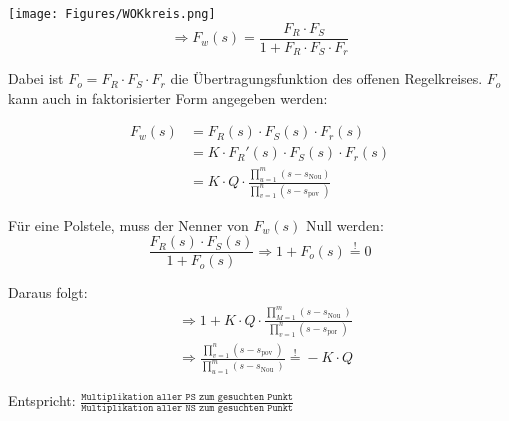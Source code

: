 \texttt{[image: Figures/WOKkreis.png]}
\[
	\Rightarrow F_w (s)= \dfrac {F_R \cdot F_S} {1+F_R \cdot F_S \cdot F_r}
\]

\begin{mdframed}[style=exercise]
	Dabei ist $F_o = F_R \cdot F_S \cdot F_r$ die Übertragungsfunktion des
	offenen Regelkreises. $F_o$ kann auch in faktorisierter Form angegeben
	werden:
\end{mdframed}

\begin{align*}
	F_w (s) & = F_R (s) \cdot F_S (s) \cdot F_r (s)
	\\ & =K \cdot F_R '(s) \cdot F_S (s) \cdot F_r (s)
	\\ & =K \cdot Q \cdot \frac{\prod_{u=1}^{m}\left(s-s_{\text {Nou}}\right)}{\prod_{v=1}^{n}\left(s-s_{\text {pov }}\right)}
\end{align*}

Für eine Polstele, muss der Nenner von $F_w (s)$ Null werden:
\[
	\dfrac{F_R (s) \cdot F_S (s)}{1+F_o (s)} \Rightarrow 1+F_o (s) \stackrel{!}{=}0
\]

Daraus folgt:
\begin{align*}
	 & \Rightarrow 1+ K \cdot Q \cdot \frac{\prod_{M=1}^{m}\left(s-s_{\text {Nou }}\right)}{\prod_{v=1}^{n}\left(s-s_{\text {por }}\right)}         \\
	 & \Rightarrow \frac{\prod_{v=1}^{n}\left(s-s_{\text {pov }}\right)}{\prod_{u=1}^{m}\left(s-s_{\text {Nou }}\right)} \stackrel{!}{=} -K \cdot Q
\end{align*}

Entspricht: $\frac{\texttt{Multiplikation aller PS zum gesuchten Punkt}}
	{\texttt{Multiplikation aller NS zum gesuchten Punkt}}$

